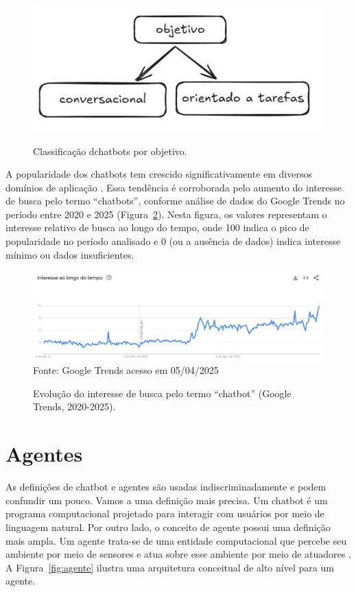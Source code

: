 \documentclass[14pt,a4paper,oneside]{book}
\begin{document}
\begin{figure}[!htb]
	\centering
	\caption{Classificação dchatbots por objetivo.}
	\includegraphics[width=0.9\linewidth]{./fig/tipo_objetivo.png}
	\label{fig:tipo}
\end{figure}

A popularidade dos chatbots tem crescido significativamente em diversos domínios de aplicação \cite{B2020, Klopfenstein2017, Sharma2020}. 
Essa tendência é corroborada pelo aumento do interesse de busca pelo termo ``chatbots'', conforme análise de dados do Google Trends no período entre 2020 e 2025 (Figura~\ref{fig:trends}). 
Nesta figura, os valores representam o interesse relativo de busca ao longo do tempo, onde 100 indica o pico de popularidade no período analisado e 0 (ou a ausência de dados) indica interesse mínimo ou dados insuficientes.

\begin{figure}[!htbp]
	\centering
	\caption{Evolução do interesse de busca pelo termo ``chatbot'' (Google Trends, 2020-2025).}
	\includegraphics[width=1\linewidth]{./fig/trends.png}
	\label{fig:trends}
	{\footnotesize Fonte: Google Trends acesso em 05/04/2025} %
\end{figure}

\section{Agentes}

As definições de chatbot e agentes são usadas indiscriminadamente e podem confundir um pouco. Vamos a uma definição mais precisa.
Um chatbot é um programa computacional projetado para interagir com usuários por meio de linguagem natural. 
Por outro lado, o conceito de agente possui uma definição mais ampla. Um agente trata-se de uma entidade computacional que percebe seu ambiente por meio de sensores e atua sobre esse ambiente por meio de atuadores \cite{Russel2013}. 
A Figura~\ref{fig:agente} ilustra uma arquitetura conceitual de alto nível para um agente.
\end{document}

